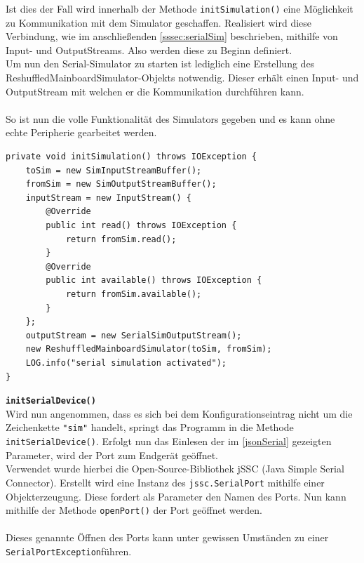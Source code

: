 Ist dies der Fall wird innerhalb der Methode \lstinline{initSimulation()} eine Möglichkeit zu Kommunikation mit dem Simulator geschaffen.
Realisiert wird diese Verbindung, wie im anschließenden \autoref{sssec:serialSim} beschrieben, mithilfe von Input- und OutputStreams.
Also werden diese zu Beginn definiert.\\
Um nun den Serial-Simulator zu starten ist lediglich eine Erstellung des ReshuffledMainboardSimulator-Objekts notwendig.
Dieser erhält einen Input- und OutputStream mit welchen er die Kommunikation durchführen kann.\\\\
So ist nun die volle Funktionalität des Simulators gegeben und es kann ohne echte Peripherie gearbeitet werden.
%
\begin{lstlisting}[style=java,caption=Methode initSimulation(),label=fdsafdsafds]
private void initSimulation() throws IOException {
    toSim = new SimInputStreamBuffer();
    fromSim = new SimOutputStreamBuffer();
    inputStream = new InputStream() {
        @Override
        public int read() throws IOException {
            return fromSim.read();
        }
        @Override
        public int available() throws IOException {
            return fromSim.available();
        }
    };
    outputStream = new SerialSimOutputStream();
    new ReshuffledMainboardSimulator(toSim, fromSim);
    LOG.info("serial simulation activated");
}
\end{lstlisting}
\textbf{\lstinline{initSerialDevice()}}
\\
Wird nun angenommen, dass es sich bei dem Konfigurationseintrag nicht um die Zeichenkette \lstinline[style=json]{"sim"} handelt, springt das Programm in die Methode \lstinline{initSerialDevice()}.
Erfolgt nun das Einlesen der im \autoref{jsonSerial} gezeigten Parameter, wird der Port zum Endgerät geöffnet.\\
Verwendet wurde hierbei die Open-Source-Bibliothek jSSC (Java Simple Serial Connector).
Erstellt wird eine Instanz des \lstinline[style=java]{jssc.SerialPort} mithilfe einer Objekterzeugung.
Diese fordert als Parameter den Namen des Ports.
Nun kann mithilfe der Methode \lstinline{openPort()} der Port geöffnet werden.\\\\
Dieses genannte Öffnen des Ports kann unter gewissen Umständen zu einer \lstinline[style=java]{SerialPortException}führen.
